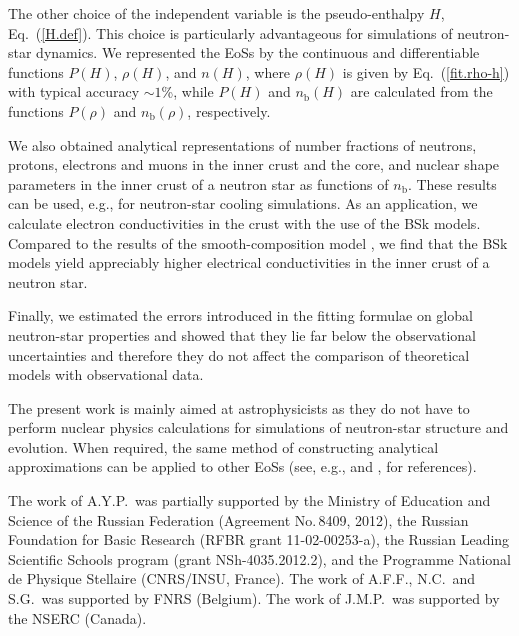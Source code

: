 \documentclass{aa}
\newcommand{\req}[1]{Eq.~(\ref{#1})}
\newcommand{\nb}{n_\mathrm{b}}
\begin{document}
The other choice of the independent variable is the
pseudo-enthalpy $H$, \req{H.def}. This choice is
particularly advantageous for simulations of neutron-star
dynamics. We represented the EoSs by the continuous and
differentiable functions $P(H)$, $\rho(H)$, and $n(H)$,
where $\rho(H)$ is given by \req{fit.rho-h} with typical
accuracy $\sim1$\%, while $P(H)$ and $\nb(H)$ are calculated
from the functions $P(\rho)$ and $\nb(\rho)$, respectively. 

We also obtained analytical representations of number
fractions of neutrons, protons, electrons and muons in the
inner crust and the core, and nuclear shape parameters in
the inner crust of a neutron star as functions of $\nb$.
These results can be used, e.g., for neutron-star cooling
simulations. As an application, we calculate electron
conductivities in the crust with the use of the BSk models.
Compared to the results of the smooth-composition model
\citep{GYP}, we find that the BSk models yield appreciably
higher electrical conductivities in the inner crust of a
neutron star.

Finally, we estimated the errors introduced in the fitting 
formulae on global neutron-star properties and showed that
they lie far below the observational uncertainties and
therefore they do not affect the comparison of theoretical
models with observational data.

The present work is mainly
aimed at astrophysicists as they do not have to perform
nuclear physics calculations for simulations of neutron-star
structure and evolution.
When required, the same method of constructing analytical
approximations can be applied to other EoSs (see,
e.g., \citealp{HPY} and \citealp{lattimer2012}, for
references).

\begin{acknowledgements}
The work of A.Y.P.\ was partially supported by the Ministry
of Education and Science of the Russian Federation
(Agreement No.\,8409, 2012), the Russian Foundation for
Basic Research (RFBR grant 11-02-00253-a), the Russian
Leading Scientific Schools program (grant NSh-4035.2012.2),
and the Programme National de Physique Stellaire (CNRS/INSU,
France). The work of A.F.F., N.C.\ and S.G.\ was supported
by FNRS (Belgium).  The work of J.M.P.\ was supported by the
NSERC (Canada). 
\end{acknowledgements}
\end{document}
